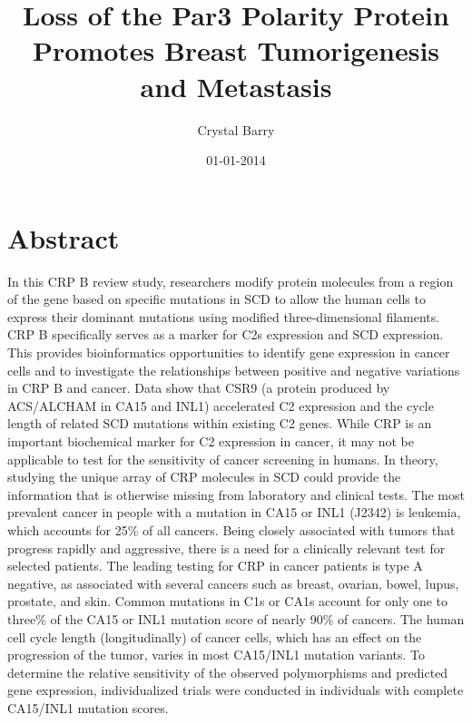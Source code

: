 \documentclass{article}%
\title{Loss of the Par3 Polarity Protein Promotes Breast Tumorigenesis and Metastasis}%
\author{Crystal Barry}%
\affil{CENAR and Department of Molecular Medicine, Faculty of Medicine, University of Malaya, Kuala Lumpur, Malaysia}%
\date{01{-}01{-}2014}%
\begin{document}
%
\normalsize%
\maketitle%
\section{Abstract}%
\label{sec:Abstract}%
In this CRP B review study, researchers modify protein molecules from a region of the gene based on specific mutations in SCD to allow the human cells to express their dominant mutations using modified three{-}dimensional filaments.\newline%
CRP B specifically serves as a marker for C2s expression and SCD expression. This provides bioinformatics opportunities to identify gene expression in cancer cells and to investigate the relationships between positive and negative variations in CRP B and cancer.\newline%
Data show that CSR9 (a protein produced by ACS/ALCHAM in CA15 and INL1) accelerated C2 expression and the cycle length of related SCD mutations within existing C2 genes. While CRP is an important biochemical marker for C2 expression in cancer, it may not be applicable to test for the sensitivity of cancer screening in humans. In theory, studying the unique array of CRP molecules in SCD could provide the information that is otherwise missing from laboratory and clinical tests.\newline%
The most prevalent cancer in people with a mutation in CA15 or INL1 (J2342) is leukemia, which accounts for 25\% of all cancers. Being closely associated with tumors that progress rapidly and aggressive, there is a need for a clinically relevant test for selected patients.\newline%
The leading testing for CRP in cancer patients is type A negative, as associated with several cancers such as breast, ovarian, bowel, lupus, prostate, and skin. Common mutations in C1s or CA1s account for only one to three\% of the CA15 or INL1 mutation score of nearly 90\% of cancers. The human cell cycle length (longitudinally) of cancer cells, which has an effect on the progression of the tumor, varies in most CA15/INL1 mutation variants. To determine the relative sensitivity of the observed polymorphisms and predicted gene expression, individualized trials were conducted in individuals with complete CA15/INL1 mutation scores.\newline%
\end{document}
